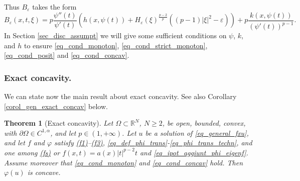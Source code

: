 \documentclass[11pt, reqno]{amsart}
\newtheorem{theorem}[lemma]{Theorem}
\theoremstyle{definition}
\numberwithin{equation}{section}
\newcommand{\R}{\mathbb{R}}
\def\eps{\varepsilon}
\begin{document}
Thus $B_{\eps}$ takes the form
\begin{equation}\label{eq_charact_Beps}
B_{\eps}(x,t,\xi)= p \frac{\psi''(t)}{\psi'(t)} \left( h(x,\psi(t)) + H_{\eps}(\xi)^{\frac{p-2}{p}} \left((p-1) |\xi|^2 - \eps \right) \right) + p \frac{k(x,\psi(t))}{(\psi'(t))^{p-1}}.
\end{equation}
In Section \ref{sec_disc_assumpt} we will give some sufficient conditions on $\psi$, $k$, and $h$ to ensure \eqref{eq_cond_monoton}, \eqref{eq_cond_strict_monoton}, \eqref{eq_cond_posit} and \eqref{eq_cond_concav}.


\subsubsection{Exact concavity.} 


We can state now the main result about exact concavity. See also Corollary \ref{corol_gen_exact_concav} below.

\begin{theorem}[Exact concavity]
\label{thm_gen_exact_concav}
Let $\Omega \subset \R^N$, $N\geq 2$, be open, bounded, convex, with $\partial \Omega \in C^{1,\alpha}$,
and let $p\in (1,+\infty)$.
Let $u$ be a solution of \eqref{eq_general_fxu}, and let $f$ and $\varphi$ satisfy \hyperlink{(f1)}{\rm{(f1)}}--\hyperlink{(f3)}{\rm{(f3)}}, \eqref{eq_def_phi_trans}-\eqref{eq_phi_trans_techn}, and one among \hyperlink{(fs)}{\rm{(fs)}} or $f(x,t) = a(x) |t|^{p-2} t$ and \eqref{eq_ipot_aggiunt_phi_eigenf}.
Assume moreover that \eqref{eq_cond_monoton} and \eqref{eq_cond_concav} hold. 
Then $\varphi(u)$ is concave.
\end{theorem}
\end{document}
